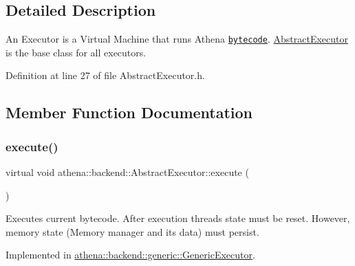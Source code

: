 \subsection{Detailed Description}
An Executor is a Virtual Machine that runs Athena \href{https://athenaframework.ml/athena/bytecode/basics.html}{\tt bytecode}. \mbox{\hyperlink{classathena_1_1backend_1_1_abstract_executor}{Abstract\+Executor}} is the base class for all executors. 

Definition at line 27 of file Abstract\+Executor.\+h.



\subsection{Member Function Documentation}
\mbox{\label{classathena_1_1backend_1_1_abstract_executor_a5f179146ae76002b678a4862553f87ce}} 
\subsubsection{\texorpdfstring{execute()}{execute()}}
{\footnotesize\ttfamily virtual void athena\+::backend\+::\+Abstract\+Executor\+::execute (\begin{DoxyParamCaption}{ }\end{DoxyParamCaption})\hspace{0.3cm}{\ttfamily [pure virtual]}}

Executes current bytecode. After execution threads state must be reset. However, memory state (Memory manager and its data) must persist. 

Implemented in \mbox{\hyperlink{classathena_1_1backend_1_1generic_1_1_generic_executor_a38b56c284050d31198b28fcb6595bc73}{athena\+::backend\+::generic\+::\+Generic\+Executor}}.

\mbox{\label{classathena_1_1backend_1_1_abstract_executor_a6d61486e2a06500c9c0aa1e03a475e4a}} 
